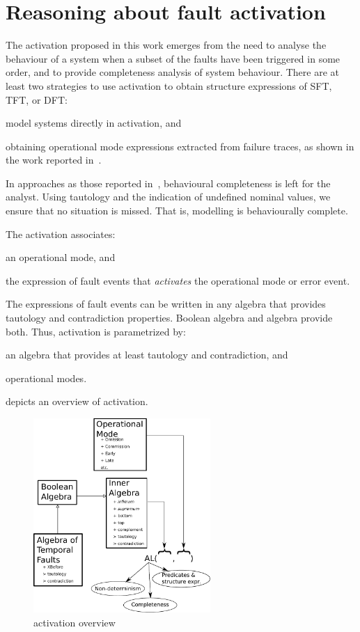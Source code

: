\chapter{Reasoning about fault activation}
\label{chap:activation}

The \ac{activation} proposed in this work emerges from the need to analyse the behaviour of a system when a subset of the faults have been triggered in some order, and to provide completeness analysis of system behaviour.
%
There are at least two strategies to use \ac{activation} to obtain structure expressions of \ac{SFT}, \ac{TFT}, or \ac{DFT}: 
\begin{alineasinline}
  \item model systems directly in \ac{activation}, and 
  \item obtaining operational mode expressions extracted from failure traces, as shown in the work reported in~\cite{DM2016}.
\end{alineasinline}
%
In approaches as those reported in~\cite{WP2009,Merle2010}, behavioural completeness is left for the analyst.
Using tautology and the indication of undefined nominal values, we ensure that no situation is missed.
That is, modelling is behaviourally complete.

The \acl{activation} associates: 
\begin{alineasinline}
  \item an operational mode, and 
  \item the expression of fault events that \emph{activates} the operational mode or error event.
\end{alineasinline}
The expressions of fault events can be written in any algebra that provides tautology and contradiction properties.
Boolean algebra and \ac{algebra} provide both.
Thus, \ac{activation} is parametrized by: 
\begin{alineasinline}
  \item an algebra that provides at least tautology and contradiction, and 
  \item operational modes.
\end{alineasinline}
 depicts an overview of \ac{activation}.
%
\begin{figure}[ht]
  \centering
  \includegraphics[width=0.6\textwidth]{logic-overview}
  \caption{\Ac{activation} overview}
  \label{fig:logic-overview}
\end{figure}

